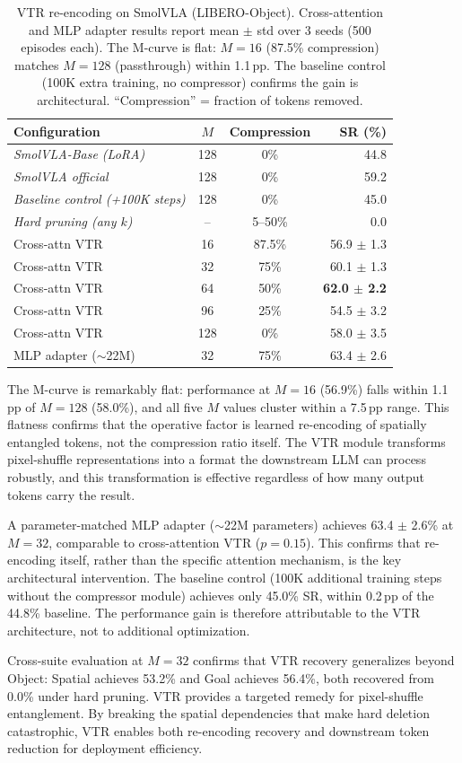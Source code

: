 \begin{table}[t]
\centering
\small
\caption{VTR re-encoding on SmolVLA (LIBERO-Object). Cross-attention and MLP adapter results report mean $\pm$ std over 3 seeds (500 episodes each). The M-curve is flat: $M{=}16$ (87.5\% compression) matches $M{=}128$ (passthrough) within 1.1\,pp. The baseline control (100K extra training, no compressor) confirms the gain is architectural. ``Compression'' = fraction of tokens removed.}
\label{tab:vtr_results}
\begin{tabular}{lccr}
\toprule
Configuration & $M$ & Compression & SR (\%) \\
\midrule
\textit{SmolVLA-Base (LoRA)} & 128 & 0\% & 44.8 \\
\textit{SmolVLA official} & 128 & 0\% & 59.2 \\
\textit{Baseline control (+100K steps)} & 128 & 0\% & 45.0 \\
\textit{Hard pruning (any $k$)} & -- & 5--50\% & 0.0 \\
\midrule
Cross-attn VTR & 16 & 87.5\% & 56.9 $\pm$ 1.3 \\
Cross-attn VTR & 32 & 75\% & 60.1 $\pm$ 1.3 \\
Cross-attn VTR & 64 & 50\% & \textbf{62.0 $\pm$ 2.2} \\
Cross-attn VTR & 96 & 25\% & 54.5 $\pm$ 3.2 \\
Cross-attn VTR & 128 & 0\% & 58.0 $\pm$ 3.5 \\
\midrule
MLP adapter ($\sim$22M) & 32 & 75\% & 63.4 $\pm$ 2.6 \\
\bottomrule
\end{tabular}
\end{table}

The M-curve is remarkably flat: performance at $M{=}16$ (56.9\%) falls within 1.1\,pp of $M{=}128$ (58.0\%), and all five $M$ values cluster within a 7.5\,pp range. This flatness confirms that the operative factor is learned re-encoding of spatially entangled tokens, not the compression ratio itself. The VTR module transforms pixel-shuffle representations into a format the downstream LLM can process robustly, and this transformation is effective regardless of how many output tokens carry the result.

A parameter-matched MLP adapter ($\sim$22M parameters) achieves 63.4 $\pm$ 2.6\% at $M{=}32$, comparable to cross-attention VTR ($p = 0.15$). This confirms that re-encoding itself, rather than the specific attention mechanism, is the key architectural intervention. The baseline control (100K additional training steps without the compressor module) achieves only 45.0\% SR, within 0.2\,pp of the 44.8\% baseline. The performance gain is therefore attributable to the VTR architecture, not to additional optimization.

Cross-suite evaluation at $M{=}32$ confirms that VTR recovery generalizes beyond Object: Spatial achieves 53.2\% and Goal achieves 56.4\%, both recovered from 0.0\% under hard pruning. VTR provides a targeted remedy for pixel-shuffle entanglement. By breaking the spatial dependencies that make hard deletion catastrophic, VTR enables both re-encoding recovery and downstream token reduction for deployment efficiency.
